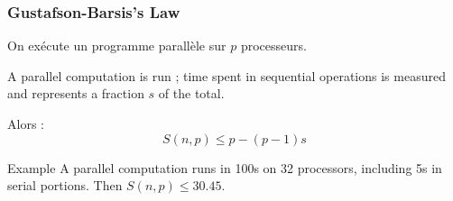 \documentclass[xcolor={x11names,svgnames,psnames}]{beamer}
\begin{document}
\begin{frame}
  \frametitle{Gustafson-Barsis's Law}

  On exécute un programme parallèle sur $p$ processeurs.

  \medskip
  
  A parallel computation is run ; time spent in sequential operations is measured and represents a fraction $s$ of the total.

  \medskip
  
  Alors :
  \[
    S(n, p) \leq  p - (p-1)s
  \]

    \medskip
  
    \begin{block}{Example}
      A parallel computation runs in 100s on 32 processors, including 5s in serial portions.
      Then $S(n, p) \leq 30.45$.
    \end{block}
  \end{frame}


\end{document}

